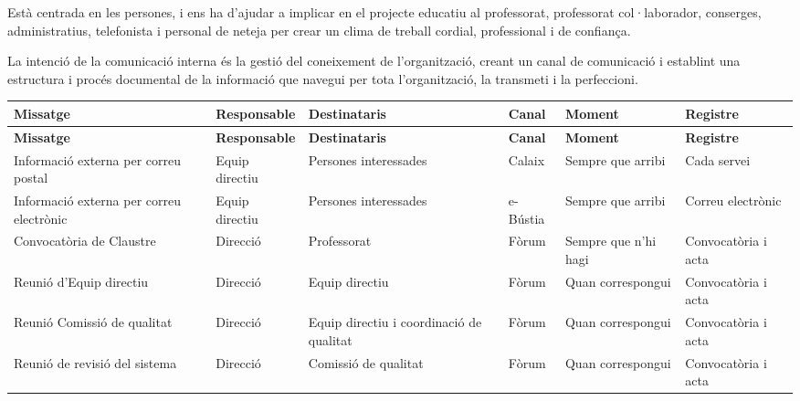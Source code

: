 \documentclass[fontsize=10pt,%
paper=a4,%
DIV=14,%
twoside=semi,%
pagesize=auto,%
parskip=half,
captions=tableheading,%
numbers=noenddot,%
toc=graduated%
]{scrartcl}
\renewcommand{\arraystretch}{1.75}%
\renewcommand{\arraystretch}{1.75}%
\begin{document}
Està centrada en les persones, i ens ha d'ajudar a implicar en el projecte educatiu al
professorat, professorat col·laborador, conserges, administratius, telefonista i personal de neteja per crear un clima de treball cordial, professional i de confiança.

La intenció de la comunicació interna és la gestió del coneixement de l'organització, creant un canal de comunicació i establint una estructura i procés documental de la
informació que navegui per tota l'organització, la transmeti i la perfeccioni.

\small{
\setlength{\tabcolsep}{10pt}
\renewcommand{\arraystretch}{1.5}
\begin{longtable}{p{3cm}p{2cm}p{2cm}p{1.5cm}p{2cm}p{1.5cm}}
\hline
\textbf{Missatge}                        & \textbf{Responsable}     & \textbf{Destinataris}                    & \textbf{Canal} & \textbf{Moment}      & \textbf{Registre}                                          \\
\hline \endfirsthead
\hline
\textbf{Missatge}                        & \textbf{Responsable}     & \textbf{Destinataris}                    & \textbf{Canal} & \textbf{Moment}      & \textbf{Registre}                                          \\
\hline \endhead
Informació externa per correu postal     & Equip directiu           & Persones interessades                    & Calaix         & Sempre que arribi    & Cada servei                                                \\
Informació externa per correu electrònic & Equip directiu           & Persones interessades                    & e-Bústia       & Sempre que arribi    & Correu electrònic                                          \\
Convocatòria de Claustre                 & Direcció                 & Professorat                              & Fòrum          & Sempre que n'hi hagi & Convocatòria i acta                                        \\
Reunió d'Equip directiu                  & Direcció                 & Equip directiu                           & Fòrum          & Quan correspongui    & Convocatòria i acta                                        \\
Reunió Comissió de qualitat              & Direcció                 & Equip directiu i coordinació de qualitat & Fòrum          & Quan correspongui    & Convocatòria i acta                                        \\
Reunió de revisió del sistema            & Direcció                 & Comissió de qualitat                     & Fòrum          & Quan correspongui    & Convocatòria i acta                                        \\

\end{longtable}}
\end{document}
